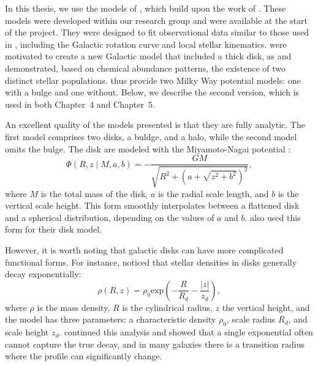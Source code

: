         In this thesis, we use the models of \citet{2017A&A...598A..66P}, which build upon the work of \citet{1991RMxAA..22..255A}. These models were developed within our research group and were available at the start of the project. They were designed to fit observational data similar to those used in \citet{2015ApJS..216...29B}, including the Galactic rotation curve and local stellar kinematics. \citet{2017A&A...598A..66P} were motivated to create a new Galactic model that included a thick disk, as \citet{2013A&A...560A.109H} and \citet{2015A&A...578A..87S} demonstrated, based on chemical abundance patterns, the existence of two distinct stellar populations. \citet{2017A&A...598A..66P} thus provide two Milky Way potential models: one with a bulge and one without. Below, we describe the second version, which is used in both Chapter~4 and Chapter~5.

        An excellent quality of the models presented \citet{2017A&A...598A..66P} is that they are fully analytic. The first model comprises two disks, a buldge, and a halo, while the second model omits the bulge. The disk are modeled with the Miyamoto-Nagai potential \citep{1975PASJ...27..533M}:
        \begin{equation}
            \Phi(R, z \mid M, a, b) = -\frac{G M}{\sqrt{R^2 + \left(a + \sqrt{z^2 + b^2}\right)^2}},
        \end{equation}
        where $M$ is the total mass of the disk, $a$ is the radial scale length, and $b$ is the vertical scale height. This form smoothly interpolates between a flattened disk and a spherical distribution, depending on the values of $a$ and $b$. \citet{2015ApJS..216...29B} also used this form for their disk model.

        However, it is worth noting that galactic disks can have more complicated functional forms. For instance, \citet{1970ApJ...160..811F} noticed that stellar densities in disks generally decay exponentially:
        \begin{equation}\label{eq:exponentialDisk}
            \rho(R,z) = \rho_0 \mathrm{exp}\left(-\frac{R}{R_d}-\frac{|z|}{z_d}\right),
        \end{equation}
        where $\rho$ is the mass density, $R$ is the cylindrical radius, $z$ the vertical height, and the model has three parameters: a characteristic density $\rho_0$, scale radius $R_d$, and scale height $z_d$. \citet{2006A&A...454..759P} continued this analysis and showed that a single exponential often cannot capture the true decay, and in many galaxies there is a transition radius where the profile can significantly change.
        
